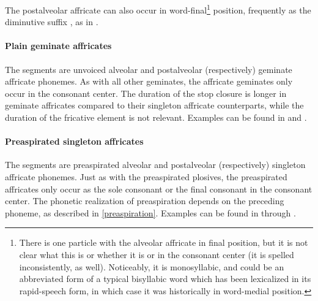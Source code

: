 The postalveolar affricate  can also occur in word-final\footnote{There is one particle  with the alveolar affricate in final position, but it is not clear what this is or whether it is  or  in the consonant center (it is spelled inconsistently, as well). Noticeably, it is monosyllabic, and could be an abbreviated form of a typical bisyllabic word which has been lexicalized in its rapid-speech form, in which case it was historically in word-medial position.} %
position, frequently as the diminutive suffix , as in .

\paragraph{Plain geminate affricates}
The segments  are unvoiced alveolar and postalveolar (respectively) geminate affricate phonemes. As with all other geminates, the affricate geminates only occur in the consonant center. The duration of the stop closure is longer in geminate affricates compared to their singleton affricate counterparts, while the duration of the fricative element is not relevant.
Examples can be found in  and .

\paragraph{Preaspirated singleton affricates}
The segments \mbox{} are preaspirated alveolar and postalveolar (respectively) singleton affricate phonemes. Just as with the preaspirated plosives, the preaspirated affricates only occur as the sole consonant or the final consonant in the consonant center. 
The phonetic realization of preaspiration depends on the preceding phoneme, as described in \SEC\ref{preaspiration}. 
Examples can be found in  through .

